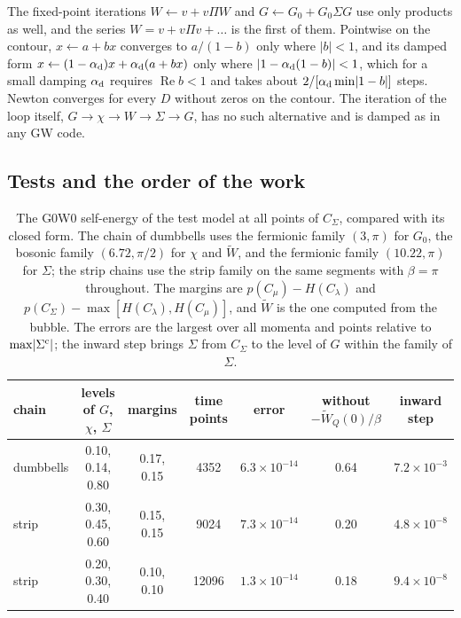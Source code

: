 \documentclass[aps,prb,reprint,a4paper]{revtex4-2}
\DeclareMathOperator{\Real}{Re}
\begin{document}
The fixed-point iterations $W\leftarrow v+v\Pi W$ and $G\leftarrow G_0+G_0\Sigma G$ use only products as well, and the series $W=v+v\Pi v+\ldots$ is the first of them. Pointwise on the contour, $x\leftarrow a+bx$ converges to $a/(1-b)$ only where $\lvert b\rvert<1$, and its damped form $x\leftarrow(1-\alpha_{\rm d})x+\alpha_{\rm d}(a+bx)$ only where $\lvert1-\alpha_{\rm d}(1-b)\rvert<1$, which for a small damping $\alpha_{\rm d}$ requires $\Real b<1$ and takes about $2/[\alpha_{\rm d}\min\lvert1-b\rvert]$ steps. Newton converges for every $D$ without zeros on the contour. The iteration of the loop itself, $G\to\chi\to W\to\Sigma\to G$, has no such alternative and is damped as in any GW code.

\subsection{Tests and the order of the work}
\label{sec:gw_tests}

\begin{table}[t]
\caption{The G0W0 self-energy of the test model at all points of $C_\Sigma$, compared with its closed form. The chain of dumbbells uses the fermionic family $(3,\pi)$ for $G_0$, the bosonic family $(6.72,\pi/2)$ for $\chi$ and $\tilde W$, and the fermionic family $(10.22,\pi)$ for $\Sigma$; the strip chains use the strip family on the same segments with $\beta=\pi$ throughout. The margins are $p(C_\mu)-H(C_\lambda)$ and $p(C_\Sigma)-\max[H(C_\lambda),H(C_\mu)]$, and $\tilde W$ is the one computed from the bubble. The errors are the largest over all momenta and points relative to $\max\lvert\Sigma^{\rm c}\rvert$; the inward step brings $\Sigma$ from $C_\Sigma$ to the level of $G$ within the family of $\Sigma$.}
\label{tab:gw}
\centering\small
\setlength{\tabcolsep}{6pt}
\begin{tabular}{@{}lcccccc@{}}
\toprule
chain & levels of $G$, $\chi$, $\Sigma$ & margins & time points & error & without $-\tilde W_Q(0)/\beta$ & inward step \\
\midrule
dumbbells & 0.10, 0.14, 0.80 & 0.17, 0.15 & 4352 & $6.3\times10^{-14}$ & 0.64 & $7.2\times10^{-3}$ \\
strip & 0.30, 0.45, 0.60 & 0.15, 0.15 & 9024 & $7.3\times10^{-14}$ & 0.20 & $4.8\times10^{-8}$ \\
strip & 0.20, 0.30, 0.40 & 0.10, 0.10 & 12096 & $1.3\times10^{-14}$ & 0.18 & $9.4\times10^{-8}$ \\
\bottomrule
\end{tabular}
\end{table}
\end{document}
